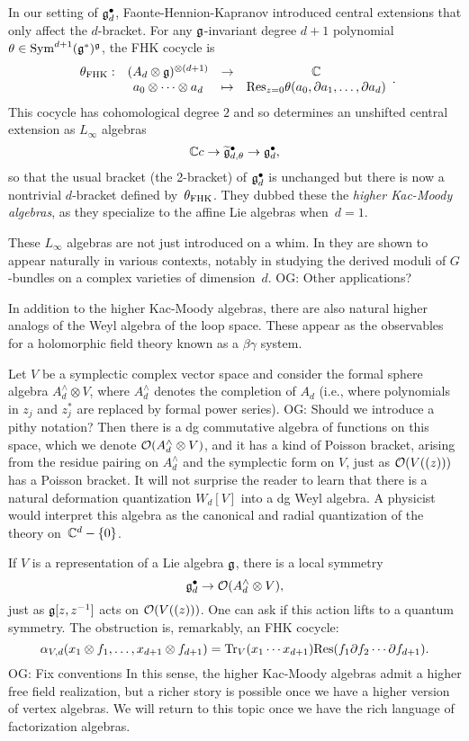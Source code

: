 \documentclass[11pt]{amsart}
\def\owen#1{{\textcolor{violet!65!black}{OG: {#1}}}}
\begin{document}
In our setting of $\mathfrak g^\bullet_d$, Faonte-Hennion-Kapranov introduced central extensions that only affect the $d$-bracket.
For any $\mathfrak g$-invariant degree $d+1$ polynomial  $\theta \in \operatorname{Sym}^{d+1}(\mathfrak g^*)^\mathfrak g$,  the FHK  cocycle is
\[
\label{fhk cocycle}
\begin{array}{cccc}
\theta_{\rm FHK} : & (A_d \otimes \mathfrak g)^{\otimes (d+1)} & \to & \mathbb C\\ 
& a_0 \otimes \cdots \otimes a_d & \mapsto & {\rm Res}_{z=0} \theta(a_0,\partial a_1,\ldots,\partial a_d)
\end{array}.
\]
This cocycle has cohomological degree $2$ and so determines an unshifted central extension as $L_\infty$ algebras
\[
\mathbb C c \to \widetilde{\mathfrak g}^\bullet_{d, \theta} \to \mathfrak g^\bullet_d ,
\]
so that the usual bracket (the 2-bracket) of $\mathfrak g^\bullet_d$ is unchanged but there is now a nontrivial $d$-bracket defined by~$\theta_{\rm FHK}$.
They dubbed these the {\em higher Kac-Moody algebras}, 
as they specialize to the affine Lie algebras when~$d =1$.

These $L_\infty$ algebras are not just introduced on a whim.
In \cite{FHK} they are shown to appear naturally in various contexts,
notably in studying the derived moduli of $G$-bundles on a complex varieties of dimension~$d$.
\owen{Other applications?}

In addition to the higher Kac-Moody algebras, there are also natural higher analogs of the Weyl algebra of the loop space.
These appear as the observables for a holomorphic field theory known as a $\beta\gamma$ system.

Let $V$ be a symplectic complex vector space and consider the formal sphere algebra $A^{\wedge}_d \otimes V$,
where $A^{\wedge}_d$ denotes the completion of $A_d$ (i.e., where polynomials in $z_j$ and $z_j^*$ are replaced by formal power series).
\owen{Should we introduce a pithy notation?}
Then there is a dg commutative algebra of functions on this space,
which we denote $\mathcal O(A^{\wedge}_d \otimes  V)$,
and it has a kind of Poisson bracket, arising from the residue pairing on $A^{\wedge}_d$ and the symplectic form on $V$,
just as $\mathcal O(V((z)))$ has a Poisson bracket.
It will not surprise the reader to learn that there is a natural deformation quantization $W_d[V]$ into a dg Weyl algebra.
A physicist would interpret this algebra as the canonical and radial quantization of the theory on~$\mathbb C^d - \{0\}$.

If $V$ is a representation of a Lie algebra $\mathfrak g$,
there is a local symmetry 
\[
\mathfrak g^\bullet_d \to \mathcal O(A^{\wedge}_d \otimes V),
\]
just as $\mathfrak g[z,z^{-1}]$ acts on $\mathcal O(V((z)))$. 
One can ask if this action lifts to a quantum symmetry.
The obstruction is, remarkably, an FHK cocycle:
\[
\alpha_{V,d}(x_1 \otimes f_1, \ldots, x_{d+1} \otimes f_{d+1}) = {\rm Tr}_V( x_1 \cdots x_{d+1}) {\rm Res}(f_1 \partial f_2 \cdots \partial f_{d+1}).
\]
\owen{Fix conventions}
In this sense, the higher Kac-Moody algebras admit a higher free field realization,
but a richer story is possible once we have a higher version of vertex algebras.
We will return to this topic once we have the rich language of factorization algebras.
\end{document}
